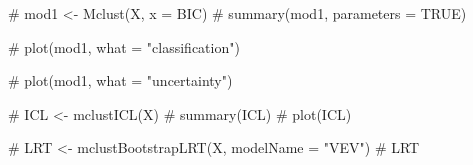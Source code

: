\documentclass[
  letterpaper,
  DIV=11,
  numbers=noendperiod]{scrartcl}
\newenvironment{Shaded}{\begin{snugshade}}{\end{snugshade}}
\newcommand{\AttributeTok}[1]{\textcolor[rgb]{0.40,0.45,0.13}{#1}}
\newcommand{\CommentTok}[1]{\textcolor[rgb]{0.37,0.37,0.37}{#1}}
\newcommand{\FunctionTok}[1]{\textcolor[rgb]{0.28,0.35,0.67}{#1}}
\newcommand{\NormalTok}[1]{\textcolor[rgb]{0.00,0.23,0.31}{#1}}
\newcommand{\SpecialCharTok}[1]{\textcolor[rgb]{0.37,0.37,0.37}{#1}}
\newcommand{\StringTok}[1]{\textcolor[rgb]{0.13,0.47,0.30}{#1}}
\begin{document}
\begin{Shaded}
\begin{Highlighting}[]
\CommentTok{\# mod1 \textless{}{-} Mclust(X, x = BIC)}
\CommentTok{\# summary(mod1, parameters = TRUE)}
\end{Highlighting}
\end{Shaded}

\begin{Shaded}
\begin{Highlighting}[]
\CommentTok{\# plot(mod1, what = "classification")}
\end{Highlighting}
\end{Shaded}

\begin{Shaded}
\begin{Highlighting}[]
\CommentTok{\# plot(mod1, what = "uncertainty")}
\end{Highlighting}
\end{Shaded}

\begin{Shaded}
\begin{Highlighting}[]
\CommentTok{\# ICL \textless{}{-} mclustICL(X)}
\CommentTok{\# summary(ICL)}
\CommentTok{\# plot(ICL)}
\end{Highlighting}
\end{Shaded}

\begin{Shaded}
\begin{Highlighting}[]
\CommentTok{\# LRT \textless{}{-} mclustBootstrapLRT(X, modelName = "VEV")}
\CommentTok{\# LRT}
\end{Highlighting}
\end{Shaded}

\begin{Shaded}
\end{Shaded}
\end{document}
